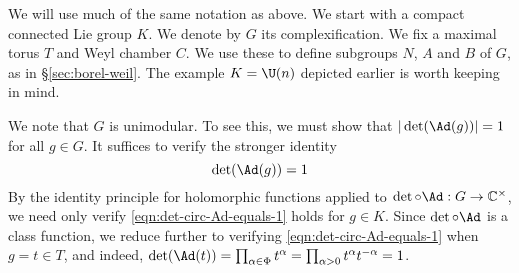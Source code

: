 \documentclass[reqno]{amsart} 
\begin{document}
We will use much of the same notation as above.  We start with a compact connected Lie group $K$.  We denote by $G$ its complexification.  We fix a maximal torus $T$ and Weyl chamber $C$.  We use these to define subgroups $N$, $A$ and $B$ of $G$, as in \S\ref{sec:borel-weil}.  The example $K = \U(n)$ depicted earlier is worth keeping in mind.

We note that $G$ is unimodular.  To see this, we must show that $|\det(\Ad(g))| = 1$ for all $g \in G$.  It suffices to verify the stronger identity
\begin{equation}\label{eqn:det-circ-Ad-equals-1}
  \det(\Ad(g)) = 1
\end{equation}
By the identity principle for holomorphic functions applied to $\det \circ \Ad : G \rightarrow \mathbb{C}^\times$, we need only verify \eqref{eqn:det-circ-Ad-equals-1} holds for $g \in K$.  Since $\det \circ \Ad$ is a class function, we reduce further to verifying \eqref{eqn:det-circ-Ad-equals-1} when $g = t \in T$, and indeed, $\det(\Ad(t)) = \prod_{\alpha \in \Phi} t^\alpha = \prod_{\alpha > 0} t^{\alpha} t^{-\alpha} = 1$.
\end{document}
